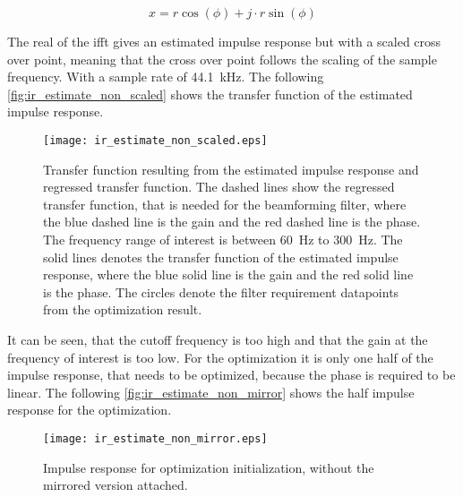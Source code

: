 \begin{equation}\label{eq:pol_to_regt}
x=r \cos(\phi)+j \cdot r \sin(\phi)
\end{equation}


    \startexplain
    \stopexplain

The real of the \gls{ifft} gives an estimated impulse response but with a scaled cross over point, meaning that the cross over point follows the scaling of the sample frequency. With a sample rate of \SI{44.1}{\kilo\hertz}. The following  \autoref{fig:ir_estimate_non_scaled} shows the transfer function of the estimated impulse response. 

\begin{figure}[H]
	\centering
	\texttt{[image: ir\_estimate\_non\_scaled.eps]}
	\caption{Transfer function resulting from the estimated impulse response and regressed transfer function. The dashed lines show the regressed transfer function, that is needed for the beamforming filter,  where the blue dashed line is the gain and the red dashed line is the phase. The frequency range of interest is between \SI{60}{\hertz} to \SI{300}{\hertz}. The solid lines denotes the transfer function of the estimated impulse response, where the blue solid line is the gain and the red solid line is the phase. The circles denote the filter requirement datapoints from the optimization result.}
		\label{fig:ir_estimate_non_scaled}
\end{figure}


It can be seen, that the cutoff frequency is too high and that the gain at the frequency of interest is too low. 
For the optimization it is only one half of the impulse response, that needs to be optimized, because the phase is required to be linear. The following \autoref{fig:ir_estimate_non_mirror} shows the half impulse response for the optimization.

\begin{figure}[H]
	\centering
	\texttt{[image: ir\_estimate\_non\_mirror.eps]}
	\caption{Impulse response for optimization initialization, without the mirrored version attached.}
		\label{fig:ir_estimate_non_mirror}
\end{figure}

